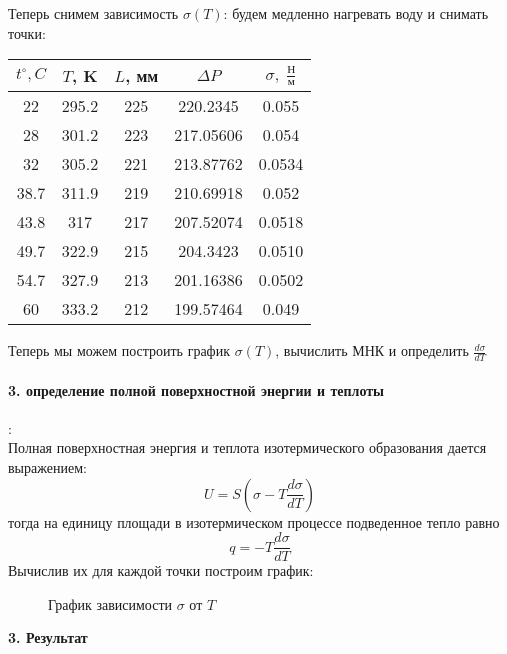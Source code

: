 \documentclass[12pt,a4paper]{article}
\begin{document}
Теперь снимем зависимость $\sigma (T)$: будем медленно нагревать воду и снимать точки:\\
\begin{center}

\begin{large}
\begin{tabular}{ccc|cc}
\hline 
$t^{\circ}, C$ & $T$, K & $L$, мм & $\Delta P$ & $\sigma, \; \frac{\text{Н}}{\text{м}}$ \\ 
\hline 
22&295.2&225&220.2345&0.055\\
28&301.2&223&217.05606&0.054\\
32&305.2&221&213.87762&0.0534\\
38.7&311.9&219&210.69918&0.052\\
43.8&317&217&207.52074&0.0518\\
49.7&322.9&215&204.3423&0.0510\\
54.7&327.9&213&201.16386&0.0502\\
60&333.2&212&199.57464&0.049\\

\end{tabular} 
\end{large}
\end{center}
Теперь мы можем построить график $\sigma (T)$, вычислить МНК и определить $\frac{d \sigma}{dT}$\\
\paragraph{3. определение полной поверхностной энергии и теплоты}:\\
Полная поверхностная энергия и теплота изотермического образования дается выражением: 
\[U = S\left( \sigma - T \frac{d \sigma}{dT}   \right) \]
тогда на единицу площади в изотермическом процессе подведенное тепло равно 
\[q = - T \frac{d \sigma}{dT}\]
Вычислив их для каждой точки построим график:\\
\newpage
\begin{figure}[h]
\centering
{}
\caption{График зависимости $\sigma $ от $T$ \label{plot}}
\end{figure}
\begin{Large}
\begin{center}
\textbf{3. Результат}\\
\end{center}
\end{Large}
\end{document}
